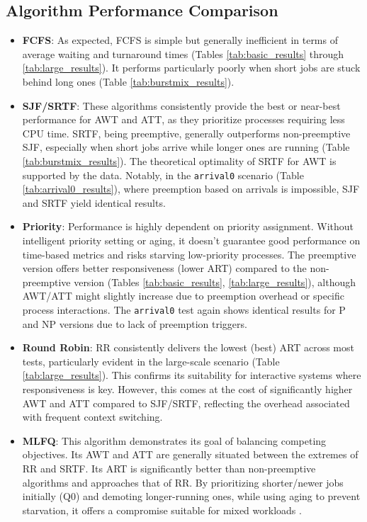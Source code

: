 \documentclass[12pt]{article}
\begin{document}
\subsection{Algorithm Performance Comparison}
\begin{itemize}
    \item \textbf{FCFS}: As expected, FCFS is simple but generally inefficient in terms of average waiting and turnaround times (Tables \ref{tab:basic_results} through \ref{tab:large_results}). It performs particularly poorly when short jobs are stuck behind long ones (Table \ref{tab:burstmix_results}).
    \item \textbf{SJF/SRTF}: These algorithms consistently provide the best or near-best performance for AWT and ATT, as they prioritize processes requiring less CPU time. SRTF, being preemptive, generally outperforms non-preemptive SJF, especially when short jobs arrive while longer ones are running (Table \ref{tab:burstmix_results}). The theoretical optimality of SRTF for AWT \citep{silberschatz2018operating} is supported by the data. Notably, in the \texttt{arrival0} scenario (Table \ref{tab:arrival0_results}), where preemption based on arrivals is impossible, SJF and SRTF yield identical results.
    \item \textbf{Priority}: Performance is highly dependent on priority assignment. Without intelligent priority setting or aging, it doesn't guarantee good performance on time-based metrics and risks starving low-priority processes. The preemptive version offers better responsiveness (lower ART) compared to the non-preemptive version (Tables \ref{tab:basic_results}, \ref{tab:large_results}), although AWT/ATT might slightly increase due to preemption overhead or specific process interactions. The \texttt{arrival0} test again shows identical results for P and NP versions due to lack of preemption triggers.
    \item \textbf{Round Robin}: RR consistently delivers the lowest (best) ART across most tests, particularly evident in the large-scale scenario (Table \ref{tab:large_results}). This confirms its suitability for interactive systems where responsiveness is key. However, this comes at the cost of significantly higher AWT and ATT compared to SJF/SRTF, reflecting the overhead associated with frequent context switching.
    \item \textbf{MLFQ}: This algorithm demonstrates its goal of balancing competing objectives. Its AWT and ATT are generally situated between the extremes of RR and SRTF. Its ART is significantly better than non-preemptive algorithms and approaches that of RR. By prioritizing shorter/newer jobs initially (Q0) and demoting longer-running ones, while using aging to prevent starvation, it offers a compromise suitable for mixed workloads \citep{nauer}.
\end{itemize}
\end{document}
